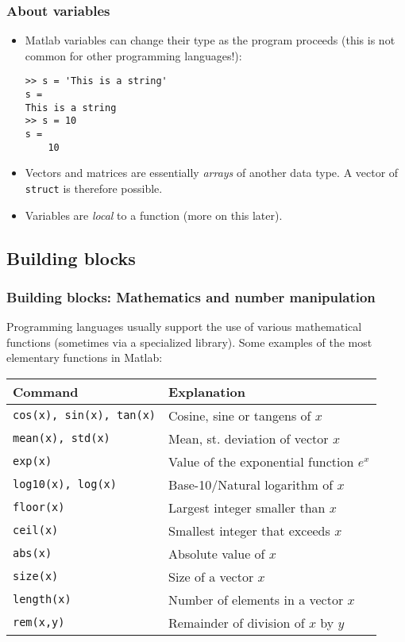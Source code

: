 \documentclass[11pt,table,final,fleqn,xcolor={usenames,dvipsnames},unknownkeysallowed]{beamer}
\begin{document}
\begin{frame}[fragile]
 \frametitle{About variables}
 \begin{itemize}
   \item Matlab variables can change their type as the program proceeds (this is not common for other programming languages!):
   \begin{lstlisting}
>> s = 'This is a string'
s =
This is a string
>> s = 10
s =
    10
\end{lstlisting}
    \item Vectors and matrices are essentially \emph{arrays} of another data type. A vector of \lstinline$struct$ is therefore possible.
    \item Variables are \emph{local} to a function (more on this later).
\end{itemize}
\end{frame}

\subsection*{Building blocks}
\begin{frame}
 \frametitle{Building blocks: Mathematics and number manipulation}
 Programming languages usually support the use of various mathematical functions (sometimes via a specialized library). Some examples of the most elementary functions in Matlab:
    \begin{longtable}{l!{\vrule}l}
      Command        & Explanation \\ \hline
      \texttt{cos(x), sin(x), tan(x)} & Cosine, sine or tangens of $x$ \\
      \texttt{mean(x), std(x)} & Mean, st. deviation of vector $x$ \\
      \texttt{exp(x)} & Value of the exponential function $e^x$ \\
      \texttt{log10(x), log(x)} & Base-10/Natural logarithm of $x$ \\
      \texttt{floor(x)} & Largest integer smaller than $x$ \\
      \texttt{ceil(x)} & Smallest integer that exceeds $x$ \\
      \texttt{abs(x)} & Absolute value of $x$ \\
      \texttt{size(x)} & Size of a vector $x$ \\
      \texttt{length(x)} & Number of elements in a vector $x$ \\
      \texttt{rem(x,y)} & Remainder of division of $x$ by $y$\\
    \end{longtable}
\end{frame}
\end{document}
